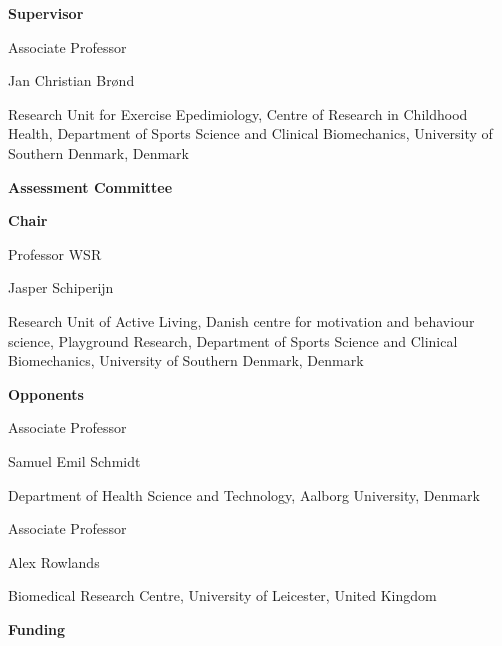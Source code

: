 \documentclass[
  10pt,
]{scrbook}
\author{}
\date{}
\let\originaltextbf\textbf
\renewcommand{\textbf}[1]{\textcolor{color1}{\textsf{\originaltextbf{#1}}}}
\begin{document}
  \frontmatter
  
  



\newpage

\textcolor{color1}{\textsf{\textbf{\Large{Supervisor}}}}

\vspace*{\baselineskip}

Associate Professor 

Jan Christian Brønd

Research Unit for Exercise Epedimiology, Centre of Research in Childhood Health, Department of Sports Science and Clinical Biomechanics, University of Southern Denmark, Denmark

\vspace{2cm}

\textcolor{color1}{\textsf{\textbf{\Large{Assessment Committee}}}}

\vspace*{\baselineskip}

\textcolor{color1}{\textbf{Chair}}

Professor WSR 

Jasper Schiperijn

Research Unit of Active Living, Danish centre for motivation and behaviour science, Playground Research, Department of Sports Science and Clinical Biomechanics, University of Southern Denmark, Denmark

\bigskip

\textcolor{color1}{\textbf{Opponents}}

\begin{multicols}{2}

Associate Professor 

Samuel Emil Schmidt

Department of Health Science and Technology, Aalborg University, Denmark

\columnbreak

Associate Professor 

Alex Rowlands

Biomedical Research Centre, \newline University of Leicester, United Kingdom

\end{multicols}

\vspace{2cm}

\textcolor{color1}{\textsf{\textbf{\Large{Funding}}}}
\end{document}
